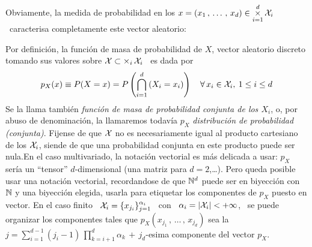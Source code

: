 Obviamente, la  medida de probabilidad  en los $\displaystyle  x = (x_1 \,  , \,
\ldots \, , \, x_d)  \in \operatorname*{\times}_{i=1}^d \mathcal{X}_i$ \ caracterisa completamente este
vector aleatorio:
%
\begin{definicion}
  Por  definici\'on,  la  funci\'on  de  masa de  probabilidad  de  $X$,  vector
  aleatorio discreto tomando sus valores sobre $\mathcal{X} \subset \operatorname*{\times}_i \mathcal{X}_i$ \ es
  dada por
  \[
  p_X(x) \equiv  P(X =  x) =  P\left( \bigcap_{i=1}^d \left(  X_i =  x_i \right)
  \right) \quad \forall \, x_i \in \mathcal{X}_i, \: 1 \le i \le d
  \]
  Se la llama  tambi\'en {\it funci\'on de masa de  probabilidad conjunta de los
    $X_i$}, o, por  abuso de denominaci\'on, la llamaremos  todav\'ia $p_X$ {\it
    distribuci\'on  de probabilidad  (conjunta)}.   Fijense de  que  $\mathcal{X}$ no  es
  necesariamente igual al  producto cartesiano de los $\mathcal{X}_i$,  siende de que una
  probabilidad  conjunta en  este producto  puede ser  nula.\newline En  el caso
  multivariado, la notaci\'on vectorial es  m\'as delicada a usar: $p_X$ ser\'ia
  un ``tensor''  $d$-dimensional (una matriz  para $d = 2$,\ldots).   Pero queda
  posible usar una notaci\'on vectorial, recordandose de que $\mathbb{N}^d$ puede ser
  en biyecci\'on  con $\mathbb{N}$ y  una biyecci\'on elegida, usarla  para etiquetar
  los componentes  de $p_X$ puesto en  vector.  En el  caso finito \ $\mathcal{X}_i  = \{
  x_{j_i} \}_{j=1}^{\alpha_i}$ \ con \ $\alpha_i = |\mathcal{X}_i| < +\infty$, \ se puede
  organizar  los  componentes tales  que  $p_X(x_{j_1}\, ,  \,  \ldots  \, ,  \,
  x_{j_d})$  sea   la  $\displaystyle  j   =  \sum_{i=1}^{d-1}  (j_i  -   1)  \,
  \prod_{k=i+1}^d \alpha_k \, + \, j_d$-esima componente del vector $p_X$.
\end{definicion}
%
\noindent {}

